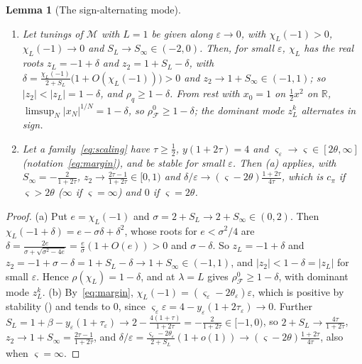 \documentclass[11pt]{article}
\newtheorem{lemma}[theorem]{Lemma}
\theoremstyle{definition}
\theoremstyle{remark}
\newcommand{\R}{\mathbb R}
\newcommand{\cF}{\mathcal F}
\newcommand{\cM}{\mathcal M}
\newcommand{\rhoz}{\rho_{\cF}^{0}}
\newcommand{\cpi}{c_{\pi}}
\begin{document}
\begin{lemma}[The sign-alternating mode]\label{lem:altmode}
\leavevmode
\begin{enumerate}[label=\textup{(\alph*)}]
\item Let tunings of \(\cM\) with \(L=1\) be given along \(\varepsilon\to0\), with \(\chi_L(-1)>0\), \(\chi_L(-1)\to0\) and \(S_L\to S_\infty\in(-2,0)\).  Then, for small
\(\varepsilon\), \(\chi_L\) has the real roots \(z_L=-1+\delta\) and \(z_2=1+S_L-\delta\), with
\(\delta=\frac{\chi_L(-1)}{2+S_L}\bigl(1+O(\chi_L(-1))\bigr)>0\) and \(z_2\to1+S_\infty\in(-1,1)\); so \(|z_2|<|z_L|=1-\delta\), and \(\rho_q\ge1-\delta\).  From rest with \(x_0=1\)
on \(\frac12x^2\) on \(\R\), \(\limsup_N|x_N|^{1/N}=1-\delta\), so \(\rhoz\ge1-\delta\); the dominant mode \(z_L^k\) alternates in sign.
\item Let a family~\eqref{eq:scaling} have \(\tau\ge\frac12\), \(y(1+2\tau)=4\) and \(\varsigma_\varepsilon\to\varsigma\in[2\theta,\infty]\) (notation~\eqref{eq:margin}), and be stable for
small \(\varepsilon\).  Then (a) applies, with \(S_\infty=-\frac2{1+2\tau}\), \(z_2\to\frac{2\tau-1}{1+2\tau}\in[0,1)\) and
\(\delta/\varepsilon\to(\varsigma-2\theta)\frac{1+2\tau}{4\tau}\), which is \(\cpi\) if \(\varsigma>2\theta\) (\(\infty\) if \(\varsigma=\infty\)) and \(0\) if \(\varsigma=2\theta\).
\end{enumerate}
\end{lemma}

\begin{proof}
(a) Put \(e=\chi_L(-1)\) and \(\sigma=2+S_L\to2+S_\infty\in(0,2)\).  Then \(\chi_L(-1+\delta)=e-\sigma\delta+\delta^2\), whose roots for \(e<\sigma^2/4\) are
\(\delta=\frac{2e}{\sigma+\sqrt{\sigma^2-4e}}=\frac e\sigma(1+O(e))>0\) and \(\sigma-\delta\).  So \(z_L=-1+\delta\) and \(z_2=-1+\sigma-\delta=1+S_L-\delta\to1+S_\infty\in(-1,1)\), and
\(|z_2|<1-\delta=|z_L|\) for small \(\varepsilon\).  Hence \(\rho(\chi_L)=1-\delta\), and  at \(\lambda=L\) gives
\(\rhoz\ge1-\delta\), with dominant mode \(z_L^k\).
(b) By~\eqref{eq:margin}, \(\chi_L(-1)=(\varsigma_\varepsilon-2\theta_\varepsilon)\varepsilon\), which is positive by stability () and tends to \(0\), since
\(\varsigma_\varepsilon\varepsilon=4-y_\varepsilon(1+2\tau_\varepsilon)\to0\).  Further \(S_L=1+\beta-y_\varepsilon(1+\tau_\varepsilon)\to2-\frac{4(1+\tau)}{1+2\tau}=-\frac2{1+2\tau}\in[-1,0)\), so
\(2+S_L\to\frac{4\tau}{1+2\tau}\), \(z_2\to1+S_\infty=\frac{2\tau-1}{1+2\tau}\), and \(\delta/\varepsilon=\frac{\varsigma_\varepsilon-2\theta_\varepsilon}{2+S_L}(1+o(1))\to(\varsigma-2\theta)\frac{1+2\tau}{4\tau}\), also when
\(\varsigma=\infty\).
\end{proof}
\end{document}

